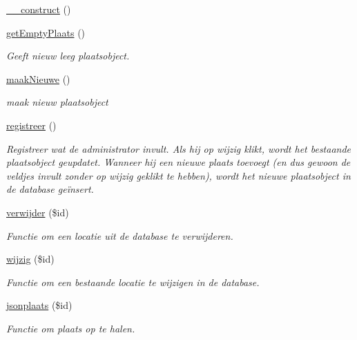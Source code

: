 \begin{DoxyCompactItemize}
\item 
\mbox{\hyperlink{class_plaats_a095c5d389db211932136b53f25f39685}{\+\_\+\+\_\+construct}} ()
\item 
\mbox{\hyperlink{class_plaats_a3a5c8647f1efcdff577c49894a2bdde8}{get\+Empty\+Plaats}} ()
\begin{DoxyCompactList}\small\item\em Geeft nieuw leeg plaatsobject. \end{DoxyCompactList}\item 
\mbox{\hyperlink{class_plaats_a7e7e04e0718668180cf4e8fb0b4dea9b}{maak\+Nieuwe}} ()
\begin{DoxyCompactList}\small\item\em maak nieuw plaatsobject \end{DoxyCompactList}\item 
\mbox{\hyperlink{class_plaats_a6db5689af94fb09c1652e5f3b1d2770a}{registreer}} ()
\begin{DoxyCompactList}\small\item\em Registreer wat de administrator invult. Als hij op wijzig klikt, wordt het bestaande plaatsobject geupdatet. Wanneer hij een nieuwe plaats toevoegt (en dus gewoon de veldjes invult zonder op wijzig geklikt te hebben), wordt het nieuwe plaatsobject in de database geïnsert. \end{DoxyCompactList}\item 
\mbox{\hyperlink{class_plaats_aa5997c2d1474e374ea50a87e8673d2e4}{verwijder}} (\$id)
\begin{DoxyCompactList}\small\item\em Functie om een locatie uit de database te verwijderen. \end{DoxyCompactList}\item 
\mbox{\hyperlink{class_plaats_aa10f6589c4f171a54524ed6758bed97f}{wijzig}} (\$id)
\begin{DoxyCompactList}\small\item\em Functie om een bestaande locatie te wijzigen in de database. \end{DoxyCompactList}\item 
\mbox{\hyperlink{class_plaats_aeac29d4165c8a50a862fe3e8df220376}{jsonplaats}} (\$id)
\begin{DoxyCompactList}\small\item\em Functie om plaats op te halen. \end{DoxyCompactList}\end{DoxyCompactItemize}


